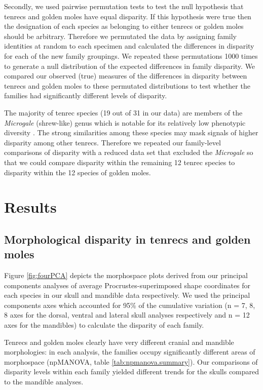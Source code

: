 \documentclass[12pt,a4paper]{article}
\begin{document}
	Secondly, we used pairwise permutation tests to test the null hypothesis that tenrecs and golden moles have equal disparity. If this hypothesis were true then the designation of each species as belonging to either tenrecs or golden moles should be arbitrary. Therefore we permutated the data by assigning family identities at random to each specimen and calculated the differences in disparity for each of the new family groupings. We repeated these permutations 1000 times to generate a null distribution of the expected differences in family disparity. We compared our observed (true) measures of the differences in disparity between tenrecs and golden moles to these permutated distributions to test whether the families had significantly different levels of disparity.

	The majority of tenrec species (19 out of 31 in our data) are members of the \textit{Microgale} (shrew-like) genus which is notable for its relatively low phenotypic diversity \citep{ Soarimalala2011, Jenkins2003}. The strong similarities among these species may mask signals of higher disparity among other tenrecs. Therefore we repeated our family-level comparisons of disparity with a reduced data set that excluded the \textit{Microgale} so that we could compare disparity within the remaining 12 tenrec species to disparity within the 12 species of golden moles.



\section{Results}


\subsection{Morphological disparity in tenrecs and golden moles} 
 
	Figure  \ref{fig:fourPCA} depicts the morphospace plots derived from our principal components analyses of average Procrustes-superimposed shape coordinates for each species in our skull and mandible data respectively. We used the principal components axes which accounted for 95\% of the cumulative variation (n = 7, 8, 8 axes for the dorsal, ventral and lateral skull analyses respectively and n = 12 axes for the mandibles) to calculate the disparity of each family. 

	Tenrecs and golden moles clearly have very different cranial and mandible morphologies: in each analysis, the families occupy significantly different areas of morphospace (npMANOVA, table \ref{tab:npmanova.summary}). 
	Our comparisons of disparity levels within each family yielded different trends for the skulls compared to the mandible analyses.
	
\end{document}
